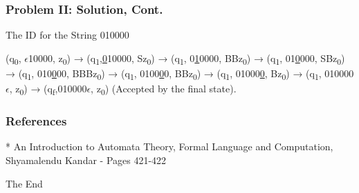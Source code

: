 \documentclass{beamer}
\begin{document}
\begin{frame}[fragile] %
	\frametitle{Problem II: Solution, Cont.}
The ID for the String 010000

\begin{flushleft}
	(q\textsubscript{0}, \underline{$\epsilon$}10000, z\textsubscript{0}) → (q\textsubscript{1},\underline{0}10000, Sz\textsubscript{0}) → (q\textsubscript{1}, 0\underline{1}0000, BBz\textsubscript{0}) → (q\textsubscript{1}, 01\underline{0}000, SBz\textsubscript{0}) → (q\textsubscript{1}, 010\underline{0}00, BBBz\textsubscript{0}) → (q\textsubscript{1}, 0100\underline{0}0, BBz\textsubscript{0}) → (q\textsubscript{1}, 01000\underline{0}, Bz\textsubscript{0}) → (q\textsubscript{1}, 010000$\epsilon$, z\textsubscript{0}) → (q\textsubscript{f},010000$\epsilon$, z\textsubscript{0}) (Accepted by the final state).
\end{flushleft}

	
\end{frame}

	
	\begin{frame}
		\frametitle{References}
		\footnotesize{
			\begin{thebibliography}{99} %
				\bibitem[Book] 
				* An Introduction to Automata Theory, Formal Language and Computation, Shyamalendu Kandar - Pages 421-422
			\end{thebibliography}
		}
	\end{frame}
	
	
	\begin{frame}
		\Huge{\centerline{The End}}
	\end{frame}
	
	
\end{document}
